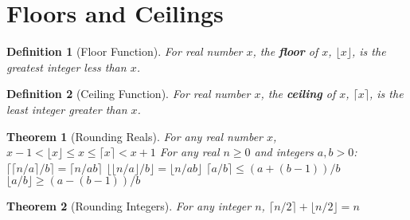 \documentclass[]{tufte-handout}
\newtheorem{theorem}{Theorem}
\newtheorem{definition}{Definition}
\begin{document}
\section{Floors and Ceilings}

\begin{definition}[Floor Function]
\leavevmode\newline{}For real number $x$, the \textbf{floor} of $x$, $\lfloor x \rfloor$, is the greatest integer less than $x$.
\end{definition}

\begin{definition}[Ceiling Function]
  \leavevmode\newline{}For real number $x$, the \textbf{ceiling} of $x$, $\lceil x \rceil$, is the least integer greater than $x$.
\end{definition}

\begin{theorem}[Rounding Reals]
  \leavevmode\newline
For any real number $x$,\newline
\hspace{.25in}$x-1 < \lfloor x \rfloor \leq x \leq \lceil x \rceil < x+1$\newline
For any real $n \geq 0$ and integers $a,b > 0$: \newline
\hspace{.25in}$\lceil \lceil n/a \rceil / b\rceil = \lceil n/ab \rceil $\newline
\hspace{.25in}$\lfloor \lfloor n/a \rfloor / b \rfloor = \lfloor n/ab \rfloor $\newline
\hspace{.25in}$\lceil a/b \rceil \leq (a + (b-1))/b $\newline
\hspace{.25in}$\lfloor a/b \rfloor \geq (a - (b-1))/b$\newline

\end{theorem}

\begin{theorem}[Rounding Integers]
  \leavevmode\newline
For any integer $n$,\newline
\hspace{.25in}$\lceil n/2 \rceil + \lfloor n/2 \rfloor = n$\newline
\end{theorem}
\end{document}

